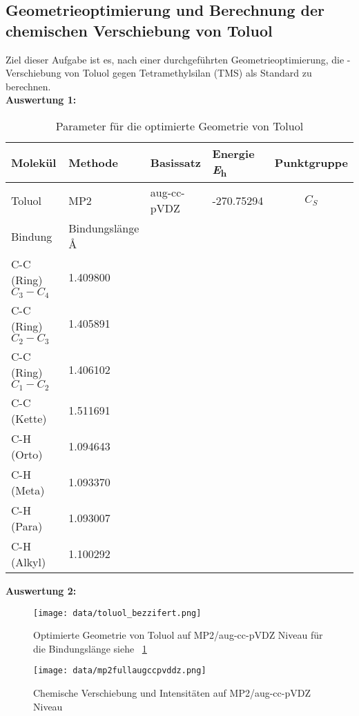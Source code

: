 \documentclass[12pt]{article}
\begin{document}
\begin{onehalfspace}

\section{Geometrieoptimierung und Berechnung der chemischen Verschiebung von Toluol}
Ziel dieser Aufgabe ist es, nach einer durchgeführten Geometrieoptimierung, die -Verschiebung
von Toluol gegen Tetramethylsilan (TMS) als Standard zu berechnen.\\
\textbf{Auswertung 1:}

\begin{table}[!htpb]


\caption{ Parameter für die optimierte Geometrie von Toluol}
\begin{tabularx}{\textwidth}{llllc}
\toprule
Molekül  & Methode & Basissatz & Energie \si{\hartree} & Punktgruppe \\
\midrule
 Toluol & MP2 & aug-cc-pVDZ & -270.75294 &$C _S$\\
\midrule
 Bindung & Bindungslänge \si{\angstrom} & &  &\\
 C-C (Ring) $C_3 - C_4$ & 1.409800 &&&\\
 C-C (Ring) $C_2 - C_3$ & 1.405891 &&&\\
 C-C (Ring) $C_1 - C_2$ & 1.406102 &&&\\
 C-C (Kette) & 1.511691 &&&\\
 C-H (Orto)  & 1.094643 &&&\\
 C-H (Meta)  & 1.093370 &&&\\
 C-H (Para)  & 1.093007 &&&\\
 C-H (Alkyl) & 1.100292 &&&\\
\bottomrule
\end{tabularx}
\label{tab:toluol}
\end{table}

\textbf{Auswertung 2:}

\begin{figure}[!htpb]
  \texttt{[image: data/toluol\_bezzifert.png]}%
  \caption{Optimierte Geometrie von Toluol auf MP2/aug-cc-pVDZ Niveau für die Bindungslänge siehe ~\ref{tab:toluol}  }
\end{figure}
\begin{figure}[!htbp]
  \texttt{[image: data/mp2fullaugccpvddz.png]}%
  \caption{Chemische Verschiebung und Intensitäten auf MP2/aug-cc-pVDZ Niveau}
\end{figure}



\end{onehalfspace}
\end{document}
